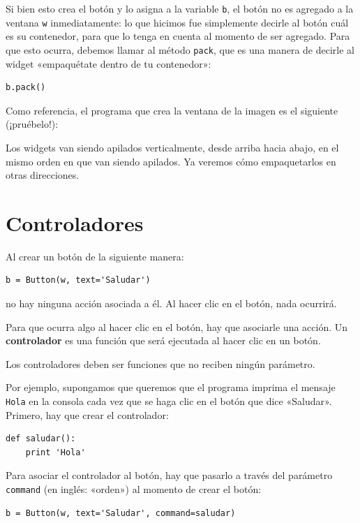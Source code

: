 Si bien esto crea el botón y lo asigna a la variable \lstinline!b!, el
botón no es agregado a la ventana \lstinline!w! inmediatamente: lo que
hicimos fue simplemente decirle al botón cuál es su contenedor, para que
lo tenga en cuenta al momento de ser agregado. Para que esto ocurra,
debemos llamar al método \lstinline!pack!, que es una manera de decirle
al widget «empaquétate dentro de tu contenedor»:

\begin{lstlisting}
b.pack()
\end{lstlisting}

Como referencia, el programa que crea la ventana de la imagen es el
siguiente (¡pruébelo!):

Los widgets van siendo apilados verticalmente, desde arriba hacia abajo,
en el mismo orden en que van siendo apilados. Ya veremos cómo
empaquetarlos en otras direcciones.

\section{Controladores}

Al crear un botón de la siguiente manera:

\begin{lstlisting}
b = Button(w, text='Saludar')
\end{lstlisting}

no hay ninguna acción asociada a él. Al hacer clic en el botón, nada
ocurrirá.

Para que ocurra algo al hacer clic en el botón, hay que asociarle una
acción. Un \textbf{controlador} es una función que será ejecutada al
hacer clic en un botón.

Los controladores deben ser funciones que no reciben ningún parámetro.

Por ejemplo, supongamos que queremos que el programa imprima el mensaje
\lstinline!Hola! en la consola cada vez que se haga clic en el botón que
dice «Saludar». Primero, hay que crear el controlador:

\begin{lstlisting}
def saludar():
    print 'Hola'
\end{lstlisting}

Para asociar el controlador al botón, hay que pasarlo a través del
parámetro \lstinline!command! (en inglés: «orden») al momento de crear
el botón:

\begin{lstlisting}
b = Button(w, text='Saludar', command=saludar)
\end{lstlisting}

